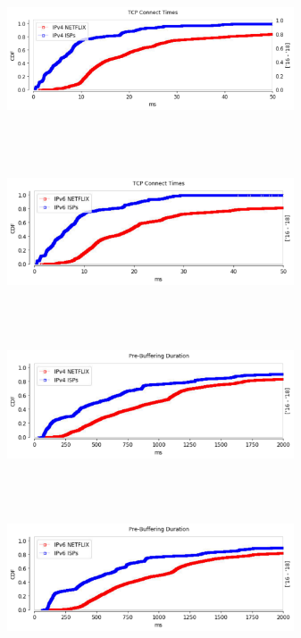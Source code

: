 \begin{figure}
	\centering
	\begin{minipage}{0.5\textwidth}
		\centering
		\includegraphics[keepaspectratio, height=5cm, width=8.5cm]{figures/cache/allisps/netflix-syn-time-separate-all-isps-v4.pdf}
	\end{minipage}
	\begin{minipage}{0.5\textwidth}
		\centering
		\includegraphics[keepaspectratio, height=5cm, width=8.5cm]{figures/cache/allisps/netflix-syn-time-separate-all-isps-v6.pdf}
	\end{minipage}
	\begin{minipage}{0.5\textwidth}
		\centering
		\includegraphics[keepaspectratio, height=5cm, width=8.5cm]{figures/cache/allisps/netflix-prebuffering-duration-separate-all-isps-v4.pdf}
	\end{minipage}
	\begin{minipage}{0.5\textwidth}
		\centering
		\includegraphics[keepaspectratio, height=5cm, width=8.5cm]{figures/cache/allisps/netflix-prebuffering-duration-separate-all-isps-v6.pdf}

\end{minipage}
\end{figure}
